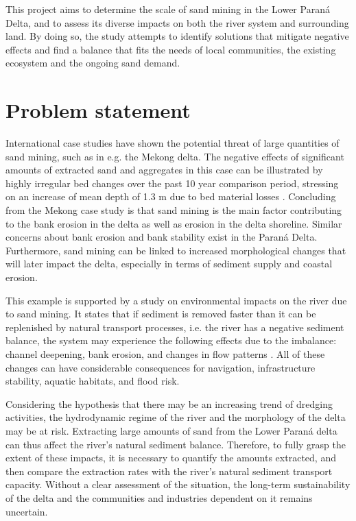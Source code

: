 This project aims to determine the scale of sand mining in the Lower Paraná Delta, and to assess its diverse impacts on both the river system and surrounding land. By doing so, the study attempts to identify solutions that mitigate negative effects and find a balance that fits the needs of local communities, the existing ecosystem and the ongoing sand demand.

\section{Problem statement}

International case studies have shown the potential threat of large quantities of sand mining, such as in e.g. the Mekong delta. The negative effects of significant amounts of extracted sand and aggregates in this case can be illustrated by highly irregular bed changes over the past 10 year comparison period, stressing on an increase of mean depth of 1.3 m due to bed material losses \autocite{brunierRecentMorphologicalChanges2014}. Concluding from the Mekong case study is that sand mining is the main factor contributing to the bank erosion in the delta as well as erosion in the delta shoreline. Similar concerns about bank erosion and bank stability exist in the Paraná Delta. Furthermore, sand mining can be linked to increased morphological changes that will later impact the delta, especially in terms of sediment supply and coastal erosion.

This example is supported by a study on environmental impacts on the river due to sand mining. It states that if sediment is removed faster than it can be replenished by natural transport processes, i.e. the river has a negative sediment balance, the system may experience the following effects due to the imbalance: channel deepening, bank erosion, and changes in flow patterns \autocite{rentierEnvironmentalImpactsRiver2022}. All of these changes can have considerable consequences for navigation, infrastructure stability, aquatic habitats, and flood risk. 

Considering the hypothesis that there may be an increasing trend of dredging activities, the hydrodynamic regime of the river and the morphology of the delta may be at risk. Extracting large amounts of sand from the Lower Paraná delta can thus affect the river's natural sediment balance. Therefore, to fully grasp the extent of these impacts, it is necessary to quantify the amounts extracted, and then compare the extraction rates with the river’s natural sediment transport capacity. Without a clear assessment of the situation, the long-term sustainability of the delta and the communities and industries dependent on it remains uncertain.

